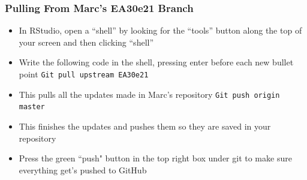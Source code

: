 \documentclass[12pt]{../SOP4_alpha}\usepackage[]{graphicx}\usepackage[]{color}
\begin{document}
\subsubsection{Pulling From Marc's EA30e21 Branch}

\begin{itemize}

\item In RStudio, open a ``shell'' by looking for the ``tools'' button along the top of your screen and then clicking ``shell''
\item Write the following code in the shell, pressing enter before each new bullet point 
  \indent\verb"Git pull upstream EA30e21"
    \item This pulls all the updates made in Marc's repository
  \indent\verb"Git push origin master" 
    \item This finishes the updates and pushes them so they are saved in your repository
\item Press the green ``push" button in the top right box under git to make sure everything get's pushed to GitHub
\end{itemize}
\end{document}
